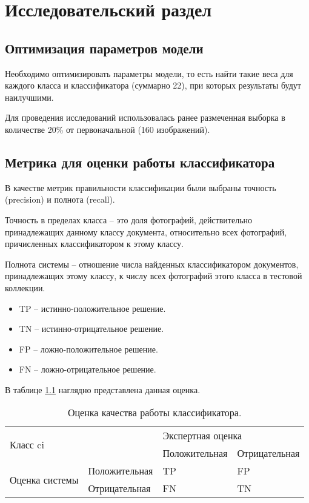 \chapter{\textbf{Исследовательский раздел}}

\section{Оптимизация параметров модели}

Необходимо оптимизировать параметры модели, то есть найти такие веса для каждого класса и классификатора (суммарно 22), при которых результаты будут наилучшими.

Для проведения исследований использовалась ранее размеченная выборка в количестве 20\% от первоначальной (160 изображений).

\section{Метрика для оценки работы классификатора}

В качестве метрик правильности классификации были выбраны точность (precision) и полнота (recall). 

Точность в пределах класса -- это доля фотографий, действительно принадлежащих данному классу документа, относительно всех фотографий, причисленных классификатором к этому классу. 

Полнота системы -- отношение числа найденных классификатором документов, принадлежащих этому классу, к числу всех фотографий этого класса в тестовой коллекции.

\begin{itemize}
\item TP -- истинно-положительное решение.
\item TN -- истинно-отрицательное решение.
\item FP -- ложно-положительное решение.
\item FN -- ложно-отрицательное решение.
\end{itemize}

В таблице \ref{table:metrics} наглядно представлена данная оценка.

\begin{table}[H]
\caption{Оценка качества работы классификатора. }
\begin{tabular}{|l|l|l|l|}
\hline
\multicolumn{2}{|l|}{\multirow{2}{*}{Класс ci}} & \multicolumn{2}{l|}{Экспертная оценка} \\ \cline{3-4} 
\multicolumn{2}{|l|}{} & Положительная      & Отрицательная     \\ \hline
\multirow{2}{*}{Оценка системы} & Положительная & TP & FP \\ \cline{2-4} 
 & Отрицательная & FN & TN \\ \hline
\end{tabular}
\label{table:metrics}
\end{table}

